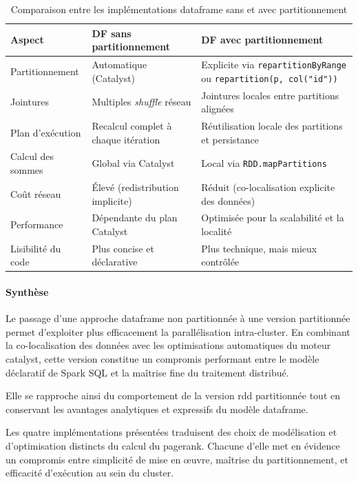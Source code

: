 \documentclass[conference]{IEEEtran}
\renewcommand{\arraystretch}{1.2}
\begin{document}
\begin{table}[H]
\centering
\caption{Comparaison entre les implémentations \gls{dataframe} sans et avec partitionnement}
\label{tab:df-vs-dfpart}
\renewcommand{\arraystretch}{1.2}
\begin{tabularx}{\linewidth}{|>{\raggedright\arraybackslash}p{3cm}|X|X|}
\hline
\textbf{Aspect} & \textbf{DF sans partitionnement} & \textbf{DF avec partitionnement} \\
\hline
Partitionnement & Automatique (Catalyst) & Explicite via \texttt{repartitionByRange} ou \texttt{repartition(p, col("id"))} \\
\hline
Jointures & Multiples \textit{shuffle} réseau & Jointures locales entre partitions alignées \\
\hline
Plan d'exécution & Recalcul complet à chaque itération & Réutilisation locale des partitions et persistance \\
\hline
Calcul des sommes & Global via Catalyst & Local via \texttt{RDD.mapPartitions} \\
\hline
Coût réseau & Élevé (redistribution implicite) & Réduit (co-localisation explicite des données) \\
\hline
Performance & Dépendante du plan Catalyst & Optimisée pour la scalabilité et la localité \\
\hline
Lisibilité du code & Plus concise et déclarative & Plus technique, mais mieux contrôlée \\
\hline
\end{tabularx}
\end{table}

\paragraph{Synthèse}

Le passage d'une approche \gls{dataframe} non partitionnée à une version partitionnée permet d'exploiter plus efficacement la parallélisation intra-cluster.  
En combinant la co-localisation des données avec les optimisations automatiques du moteur \gls{catalyst}, cette version constitue un compromis performant entre le modèle déclaratif de Spark SQL et la maîtrise fine du traitement distribué.  

Elle se rapproche ainsi du comportement de la version \gls{rdd} partitionnée tout en conservant les avantages analytiques et expressifs du modèle \gls{dataframe}.

Les quatre implémentations présentées traduisent des choix de modélisation et d'optimisation distincts du calcul du \gls{pagerank}.  
Chacune d'elle met en évidence un compromis entre simplicité de mise en œuvre, maîtrise du partitionnement, et efficacité d'exécution au sein du \gls{cluster}.
\end{document}
